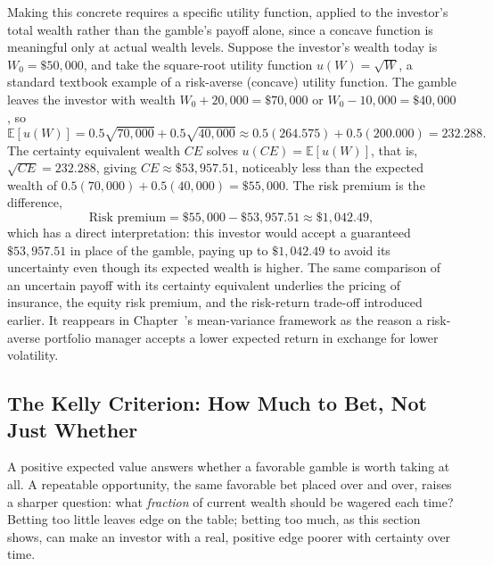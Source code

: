 \documentclass[../ai_in_finance]{subfiles}
\begin{document}
Making this concrete requires a specific utility function, applied to the investor's total wealth rather than the gamble's payoff alone, since a concave function is meaningful only at actual wealth levels. Suppose the investor's wealth today is $W_0 = \$50{,}000$, and take the square-root utility function $u(W) = \sqrt{W}$, a standard textbook example of a risk-averse (concave) utility function. The gamble leaves the investor with wealth $W_0 + 20{,}000 = \$70{,}000$ or $W_0 - 10{,}000 = \$40{,}000$, so
\begin{equation*}
\mathbb{E}[u(W)] = 0.5\sqrt{70{,}000} + 0.5\sqrt{40{,}000} \approx 0.5(264.575) + 0.5(200.000) = 232.288.
\end{equation*}
The certainty equivalent wealth $CE$ solves $u(CE) = \mathbb{E}[u(W)]$, that is, $\sqrt{CE} = 232.288$, giving $CE \approx \$53{,}957.51$, noticeably less than the expected wealth of $0.5(70{,}000) + 0.5(40{,}000) = \$55{,}000$. The risk premium is the difference,
\begin{equation*}
\text{Risk premium} = \$55{,}000 - \$53{,}957.51 \approx \$1{,}042.49,
\end{equation*}
which has a direct interpretation: this investor would accept a guaranteed $\$53{,}957.51$ in place of the gamble, paying up to $\$1{,}042.49$ to avoid its uncertainty even though its expected wealth is higher. The same comparison of an uncertain payoff with its certainty equivalent underlies the pricing of insurance, the equity risk premium, and the risk-return trade-off introduced earlier. It reappears in Chapter~'s mean-variance framework as the reason a risk-averse portfolio manager accepts a lower expected return in exchange for lower volatility.

\subsection{The Kelly Criterion: How Much to Bet, Not Just Whether}
\label{sec:kelly-criterion}

A positive expected value answers whether a favorable gamble is worth taking at all. A repeatable opportunity, the same favorable bet placed over and over, raises a sharper question: what \emph{fraction} of current wealth should be wagered each time? Betting too little leaves edge on the table; betting too much, as this section shows, can make an investor with a real, positive edge poorer with certainty over time.
\end{document}
